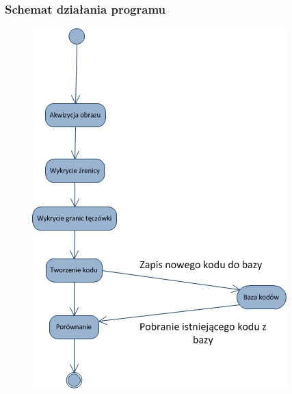 \documentclass{beamer}
\begin{document}

\begin{frame}
\frametitle{Schemat działania programu}
\begin{figure}
\begin{center}
\includegraphics[scale=0.45]{schemat.jpg}
\end{center}
\end{figure}
\end{frame}

\end{document}
